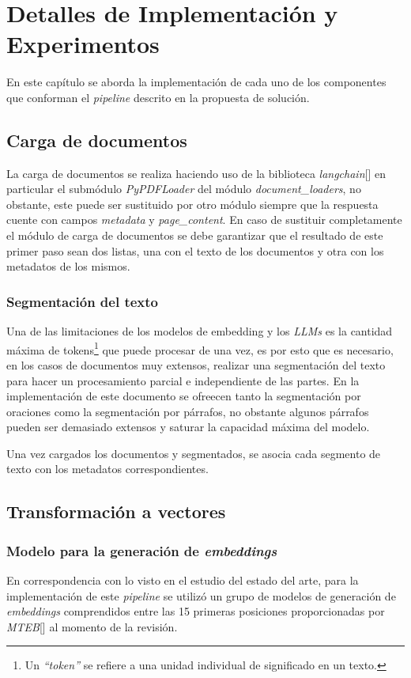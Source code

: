 \chapter{Detalles de Implementación y Experimentos}\label{chapter:implementation}
En este capítulo se aborda la implementación de cada uno de los componentes que conforman el \emph{pipeline}
descrito en la propuesta de solución.

\section{Carga de documentos}
La carga de documentos se realiza haciendo uso de la biblioteca \emph{langchain}[\cite{langchain}]
en particular el submódulo \emph{PyPDFLoader} del módulo \emph{document\_loaders}, no obstante, este puede ser sustituido por otro módulo siempre que la respuesta cuente con campos \emph{metadata} y \emph{page\_content}. En caso de sustituir completamente el módulo de carga de documentos se debe garantizar que el resultado de este primer paso sean dos listas, una con el texto de los documentos y otra con los metadatos de los mismos.
    \subsection{Segmentación del texto}
        Una de las limitaciones de los modelos de embedding y los \emph{LLMs} es la cantidad máxima de tokens\footnote{Un \emph{“token”} se refiere a una unidad individual de significado en un texto.} que puede procesar de una vez, es por esto que es necesario, en los casos de documentos muy extensos, realizar una segmentación del texto para hacer un procesamiento parcial e independiente de las partes.
        En la implementación de este documento se ofreecen tanto la segmentación por oraciones como la segmentación por párrafos, no obstante algunos párrafos pueden ser demasiado extensos y saturar la capacidad máxima del modelo.

Una vez cargados los documentos y segmentados, se asocia cada segmento de texto con los metadatos correspondientes.

\section{Transformación a vectores}
    \subsection{Modelo para la generación de \emph{embeddings}}
        En correspondencia con lo visto en el estudio del estado del arte, para la implementación de este \emph{pipeline} se utilizó un grupo de modelos de generación de \emph{embeddings} comprendidos entre las 15 primeras posiciones proporcionadas por \emph{MTEB}[\cite{leaderboard}] al momento de la revisión.

